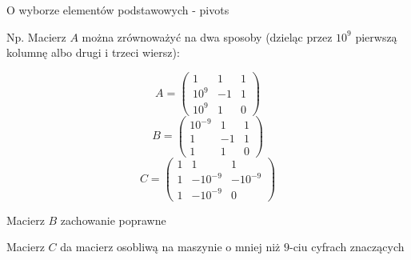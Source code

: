 \begin{frame}{ O wyborze elementów podstawowych - pivots}

Np. Macierz $A$ można zrównoważyć na dwa sposoby (dzieląc przez $10^9$ pierwszą kolumnę albo drugi i trzeci wiersz):

$$A=\left(\begin{array}{lll}
1 & 1 & 1\\
10^{9} & -1 & 1\\
10^{9} & 1 & 0
\end{array}\right)
$$
$$
B=\left(\begin{array}{lll}
10^{-9} & 1 & 1\\
1 & -1 & 1\\
1 & 1 & 0
\end{array}\right)
$$
$$
C=\left(\begin{array}{lll}
1 & 1 & 1\\
1 & -10^{-9} & -10^{-9}\\
1 & -10^{-9} & 0
\end{array}\right)
$$

Macierz $B$ zachowanie poprawne

Macierz $C$ da macierz osobliwą na maszynie o mniej niż $ 9$-ciu cyfrach znaczących

\end{frame}

